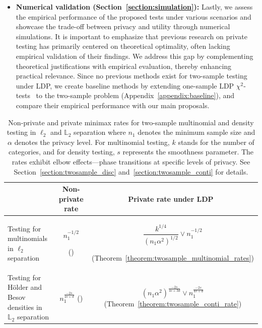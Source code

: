 \documentclass[twoside,11pt]{article}
\newcommand{\dimDensity}{d} %
\newcommand{\alphabetSize}{k} %
\newcommand{\sampleSize}{n}
\newcommand{\smoothness}{s}
\newcommand{\privacyParameter}{\alpha} %
\begin{document}
\begin{itemize}
	\item \textbf{Numerical validation (Section~\ref{section:simulation}):}
	Lastly, we assess the empirical performance of the proposed tests under various scenarios and showcase the trade-off between privacy and utility through numerical simulations. It is important to emphasize that previous research on private testing has primarily centered on theoretical optimality, often lacking empirical validation of their findings. We address this gap by complementing theoretical justifications with empirical evaluation, thereby enhancing practical relevance. Since no previous methods exist for two-sample testing under LDP, we create baseline methods by extending one-sample LDP $\chi^2$-tests~\citep{Gaboardi2018LDPChisq} to the two-sample problem (Appendix~\ref{appendix:baseline}), and compare their empirical performance with our main proposals.
\end{itemize}




\begin{table}
	\label{table:rates}
	\small
	\begin{center}
		\begin{tabular}{lcc}
			\toprule
			&Non-private rate & Private rate under LDP\ \\
			\midrule
			\rule{0pt}{15pt}
			\makecell{Testing for multinomials \\ in $\ell_2$ separation}
			&
			\makecell{$\sampleSize_1^{-1/2}$
				\\
				(\citet{chan2014optimal,kim_minimax_2022})
			}
			&
			\makecell{$
				\dfrac{\alphabetSize^{1/4}}{{(\sampleSize_1 \privacyParameter^2)^{1/2}}}
				\vee
				\sampleSize_1^{-1/2}
				$
				\\
				(Theorem~\ref{theorem:twosample_multinomial_rates})
			}
			\\
			\rule{0pt}{25pt}
			\makecell{
				Testing for H\"{o}lder and Besov \\densities in $\mathbb{L}_2$ separation}
			&%
			\makecell{ $\sampleSize_1^{\frac{-2s}{4\smoothness+\dimDensity}}$\\ (\citet{Arias-Castro2018RememberDimension})
			}
			&%
			\makecell{$(\sampleSize_1\privacyParameter^2)^{\frac{-2s}{4\smoothness+3\dimDensity}} 
				\vee
				\sampleSize_1^{\frac{-2s}{4\smoothness+\dimDensity}}$
				\\(Theorem~\ref{theorem:twosample_conti_rate})
			}
			\\
			\bottomrule
		\end{tabular}
	\end{center}
				\caption{Non-private and private minimax rates for two-sample multinomial and density testing in $\ell_2$ and $\mathbb{L}_2$ separation where $\sampleSize_1$ denotes the minimum sample size and $\privacyParameter$ denotes the privacy level. For multinomial testing, $\alphabetSize$ stands for the number of categories, and for density testing, $\smoothness$ represents the smoothness parameter.
		The rates exhibit elbow effects{---}phase transitions at specific levels of privacy.
		See Section~\ref{section:twosample_disc} and~\ref{section:twosample_conti} for details.
	}
\end{table}
%
\end{document}
